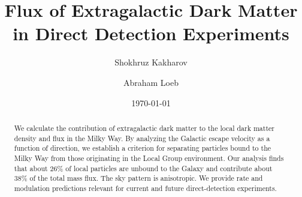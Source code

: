 \documentclass[%
 reprint,
 amsmath,amssymb,
 aps,
]{revtex4-2}
\begin{document}

\title{Flux of Extragalactic Dark Matter in Direct Detection Experiments}%


\author{Shokhruz Kakharov}
\author{Abraham Loeb}%
%

















\date{\today}%

\begin{abstract}
We calculate the contribution of extragalactic dark matter to the local dark matter density and flux in the Milky Way. By analyzing the Galactic escape velocity as a function of direction, we establish a criterion for separating particles bound to the Milky Way from those originating in the Local Group environment. Our analysis finds that about 26\% of local particles are unbound to the Galaxy and contribute about 38\% of the total mass flux. The sky pattern is anisotropic. We provide rate and modulation predictions relevant for current and future direct-detection experiments.
\end{abstract}

\maketitle


\end{document}
